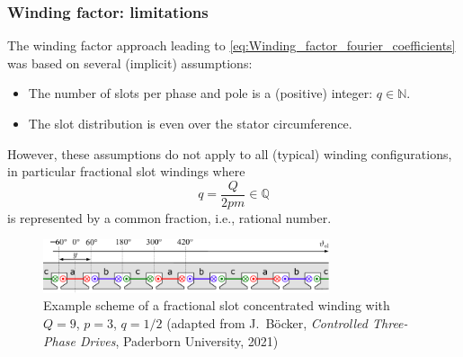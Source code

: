 \begin{frame}
	\frametitle{Winding factor: limitations}
    The winding factor approach leading to \eqref{eq:Winding_factor_fourier_coefficients} was based on several (implicit) assumptions:
    \begin{itemize}
        \item The number of slots per phase and pole is a (positive) integer: $q \in \mathbb{N}$.
        \item The slot distribution is even over the stator circumference.
    \end{itemize}
    However, these assumptions do not apply to all (typical) winding configurations, in particular fractional slot windings where $$q=\frac{Q}{2 p m} \in \mathbb{Q}$$ is represented by a common fraction, i.e., rational number. 
    \begin{figure}
        \centering
        \includegraphics[width=0.75\textwidth]{fig/lec05/Fractional_slot_concentrated_winding_example.pdf}
        \caption{Example scheme of a fractional slot concentrated winding with $Q=9$, $p = 3$, $q=1/2$ (adapted from J.~B\"ocker, \textit{Controlled Three-Phase Drives}, Paderborn University, 2021)}
        \label{fig:Fractional_slot_concentrated_winding_example}
    \end{figure}
\end{frame}

